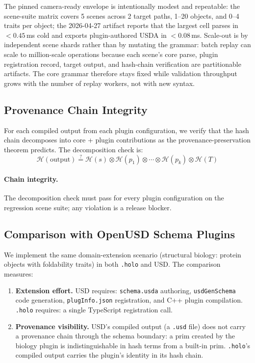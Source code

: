 \documentclass[sigconf,nonacm]{acmart}
\newcommand{\holo}{\texttt{.holo}}
\newcommand{\hashfn}{\mathcal{H}}
\newcommand{\tropmult}{\otimes}
\begin{document}
The pinned camera-ready envelope is intentionally modest and repeatable:
the scene-suite matrix covers 5 scenes across 2 target paths, 1--20 objects,
and 0--4 traits per object; the 2026-04-27 artifact reports that the largest
cell parses in $<0.45$\,ms cold and exports plugin-authored USDA in
$<0.08$\,ms. Scale-out is by independent scene shards rather than by mutating
the grammar: batch replay can scale to million-scale operations because each
scene's core parse, plugin registration record, target output, and hash-chain
verification are partitionable artifacts. The core grammar therefore stays
fixed while validation throughput grows with the number of replay workers, not
with new syntax.

\subsection{Provenance Chain Integrity}
For each compiled output from each plugin configuration,
we verify that the hash chain decomposes into core + plugin
contributions as the provenance-preservation theorem
predicts. The decomposition check is:
$$\hashfn(\text{output}) \stackrel{?}{=}
  \hashfn(s) \tropmult
  \hashfn(p_1) \tropmult \cdots \tropmult \hashfn(p_k)
  \tropmult \hashfn(T)$$

\paragraph{Chain integrity.}
The decomposition check must pass for every plugin configuration
on the regression scene suite; any violation is a release blocker.

\subsection{Comparison with OpenUSD Schema Plugins}
We implement the same domain-extension scenario (structural
biology: protein objects with foldability traits) in both
\holo{} and USD. The comparison measures:
\begin{enumerate}
  \item \textbf{Extension effort.} USD requires:
    \texttt{schema.usda} authoring, \texttt{usdGenSchema}
    code generation, \texttt{plugInfo.json} registration,
    and C++ plugin compilation. \holo{} requires: a single
    TypeScript registration call.
  \item \textbf{Provenance visibility.} USD's compiled
    output (a \texttt{.usd} file) does not carry a
    provenance chain through the schema boundary: a prim
    created by the biology plugin is indistinguishable in
    hash terms from a built-in prim. \holo{}'s compiled
    output carries the plugin's identity in its hash chain.
\end{enumerate}
\end{document}
